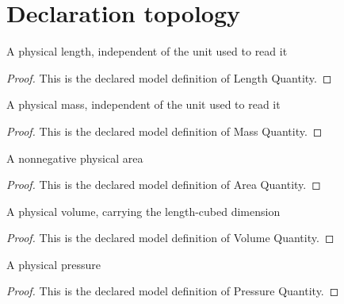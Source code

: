 \section{Declaration topology}
\begin{definition}
  \label{def:physics:phyx-mini-0333:phyxminiproblems-problemphyxmini0333-lengthquantity}
  A physical length, independent of the unit used to read it
\end{definition}
\begin{proof}
  This is the declared model definition of Length Quantity.
\end{proof}
\begin{definition}
  \label{def:physics:phyx-mini-0333:phyxminiproblems-problemphyxmini0333-massquantity}
  A physical mass, independent of the unit used to read it
\end{definition}
\begin{proof}
  This is the declared model definition of Mass Quantity.
\end{proof}
\begin{definition}
  \label{def:physics:phyx-mini-0333:phyxminiproblems-problemphyxmini0333-areaquantity}
  A nonnegative physical area
\end{definition}
\begin{proof}
  This is the declared model definition of Area Quantity.
\end{proof}
\begin{definition}
  \label{def:physics:phyx-mini-0333:phyxminiproblems-problemphyxmini0333-volumequantity}
  A physical volume, carrying the length-cubed dimension
\end{definition}
\begin{proof}
  This is the declared model definition of Volume Quantity.
\end{proof}
\begin{definition}
  \label{def:physics:phyx-mini-0333:phyxminiproblems-problemphyxmini0333-pressurequantity}
  A physical pressure
\end{definition}
\begin{proof}
  This is the declared model definition of Pressure Quantity.
\end{proof}
